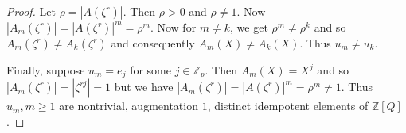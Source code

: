 \documentclass[10pt,a4paper]{amsart}
\begin{document}
\begin{proof}
Let $\rho=|A(\zeta^r)|$. Then $\rho>0$ and $\rho\neq 1$. Now $|A_m(\zeta^r)|=|A(\zeta^r)|^m=\rho^m$. Now for $m\neq k$, we get $\rho^m\neq \rho^k$ and so $A_m(\zeta^r)\neq A_k(\zeta^r)$ and consequently $A_m(X)\neq A_k(X)$. Thus $u_m\neq u_k$.


Finally, suppose $u_m=e_j$ for some $j\in \mathbb Z_p$. Then $A_m(X)=X^j$ and so $|A_m(\zeta^r)|=|\zeta^{rj}|=1$ but we have $|A_m(\zeta^r)|=|A(\zeta^r)|^m=\rho^m\neq 1$. Thus $u_m,m\geq 1$ are nontrivial, augmentation $1$, distinct idempotent elements of $\mathbb Z[Q]$.



\end{proof}
\end{document}
